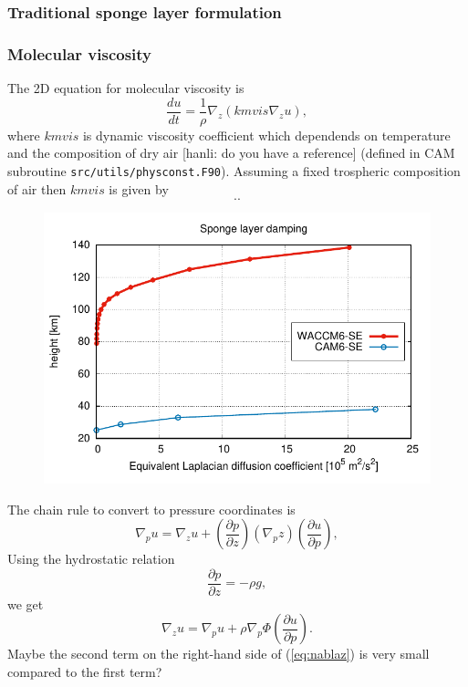 \documentclass[draft]{agujournal2019}
\begin{document}
\subsubsection{Traditional sponge layer formulation}
\subsubsection{Molecular viscosity}
The 2D equation for molecular viscosity is
\begin{equation}
    \frac{du}{dt}=\frac{1}{\rho}\nabla_z \left( kmvis \nabla_z u\right),
\end{equation}
where $kmvis$ is dynamic viscosity coefficient which dependends on temperature and the composition of dry air [hanli: do you have a reference] (defined in CAM subroutine \verb+src/utils/physconst.F90+). Assuming a fixed trospheric composition of air then $kmvis$ is given by
\begin{equation}
..
\end{equation}
\begin{figure}
\noindent\includegraphics[width=\textwidth]{figs/sponge.pdf}
\caption{}
\end{figure}


The chain rule to convert to pressure coordinates is
\begin{equation}
    \nabla_p u=\nabla_z u +\left( \frac{\partial p}{\partial z}\right) \left( \nabla_p z\right)\left(\frac{\partial u}{\partial p}\right),
\end{equation}
Using the hydrostatic relation
\begin{equation}
    \frac{\partial p}{\partial z}=-\rho g,
\end{equation}
we get
\begin{equation}\label{eq:nablaz}
   \nabla_z u= \nabla_p u+\rho \nabla_p \Phi  \left(\frac{\partial u}{\partial p}\right).
\end{equation}
Maybe the second term on the right-hand side of (\ref{eq:nablaz}) is very small compared to the first term?
\end{document}
